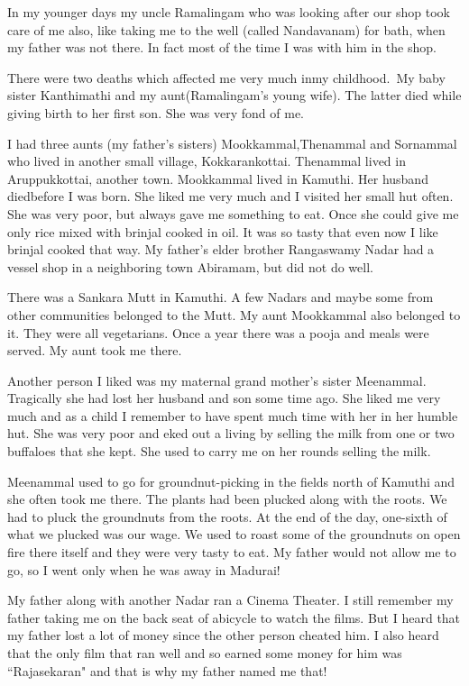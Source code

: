 In my younger days my uncle Ramalingam who was looking after our shop 
took care of me also, like taking me to the well (called Nandavanam) for 
bath, when my father was not there. In fact most of the time I was with 
him in the shop.

There were two deaths which affected me very much in\break my childhood.\ My 
baby sister Kanthimathi and my aunt\break (Ramalingam's young wife). The 
latter died while giving birth to her first son. She was very fond of 
me.

I had three aunts (my father's sisters) Mookkammal,\break Thenammal and 
Sornammal who lived in another small village, Kokkarankottai. Thenammal 
lived in Aruppukkottai, another town. Mookkammal lived in Kamuthi. Her 
husband died\break before I was born. She liked me very much and I visited her 
small hut often. She was very poor, but always gave me something to eat. 
Once she could give me only rice mixed with brinjal cooked in oil. It 
was so tasty that even now I like brinjal cooked that way. My father's 
elder brother Rangaswamy Nadar had a vessel shop in a neighboring town 
Abiramam, but did not do well.

There was a Sankara Mutt in Kamuthi. A few Nadars and maybe some from 
other communities belonged to the Mutt. My aunt Mookkammal also belonged 
to it. They were all vegetarians. Once a year there was a pooja and 
meals were served. My aunt took me there.

Another person I liked was my maternal grand mother's sister Meenammal. 
Tragically she had lost her husband and son some time ago. She liked me 
very much and as a child I remember to have spent much time with her in 
her humble hut. She was very poor and eked out a living by selling the 
milk from one or two buffaloes that she kept. She used to carry me on 
her rounds selling the milk.

Meenammal used to go for groundnut-picking in the fields north of 
Kamuthi and she often took me there. The plants had been plucked along 
with the roots. We had to pluck the groundnuts from the roots. At the 
end of the day, one-sixth of what we plucked was our wage. We used to 
roast some of the groundnuts on open fire there itself and they were 
very tasty to eat. My father would not allow me to go, so I went only 
when he was away in Madurai!

My father along with another Nadar ran a Cinema Theater. I still 
remember my father taking me on the back seat of a\break bicycle to watch the 
films. But I heard that my father lost a lot of money since the other 
person cheated him. I also heard that the only film that ran well and so 
earned some money for him was ``Rajasekaran" and that is why my father 
named me that!

